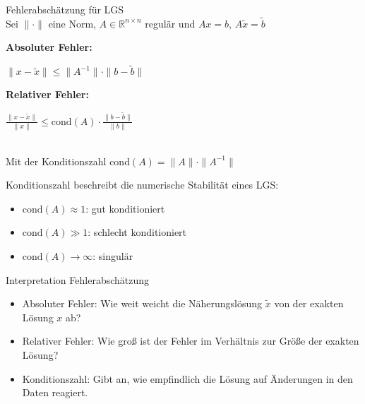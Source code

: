 \begin{theorem}{Fehlerabschätzung für LGS}\\
Sei $\|\cdot\|$ eine Norm, $A \in \mathbb{R}^{n\times n}$ regulär und $Ax = b$, $A\tilde{x} = \tilde{b}$
\vspace{1mm}\\
\begin{minipage}[t]{0.47\textwidth}
    \textbf{Absoluter Fehler:}
    \vspace{-5mm}\\
    \begin{center}
        $\|x - \tilde{x}\| \leq \|A^{-1}\| \cdot \|b - \tilde{b}\|$
    \end{center}
\end{minipage}
\hspace{2mm}
\begin{minipage}[t]{0.47\textwidth}
    \textbf{Relativer Fehler:}
    \vspace{-5mm}\\
    \begin{center}
        $\frac{\|x - \tilde{x}\|}{\|x\|} \leq \text{cond}(A) \cdot \frac{\|b - \tilde{b}\|}{\|b\|}$
    \end{center}
\end{minipage}
\vspace{1mm}\\
Mit der Konditionszahl $\text{cond}(A) = \|A\| \cdot \|A^{-1}\|$
\end{theorem}

\begin{concept}{Konditionszahl} beschreibt die numerische Stabilität eines LGS:
\begin{itemize}
    \item $\text{cond}(A) \approx 1$: gut konditioniert
    \item $\text{cond}(A) \gg 1$: schlecht konditioniert
    \item $\text{cond}(A) \to \infty$: singulär
\end{itemize}
\end{concept}

\begin{KR}{Interpretation Fehlerabschätzung}
    \begin{itemize}
        \item Absoluter Fehler: Wie weit weicht die Näherungslösung $\tilde{x}$ von der exakten Lösung $x$ ab?
        \item Relativer Fehler: Wie groß ist der Fehler im Verhältnis zur Größe der exakten Lösung?
        \item Konditionszahl: Gibt an, wie empfindlich die Lösung auf Änderungen in den Daten reagiert.
    \end{itemize}
\end{KR}



